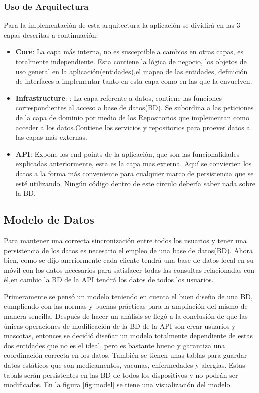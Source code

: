 \subsubsection{Uso de Arquitectura}
Para la implementación de esta arquitectura la aplicación se dividirá en las 3 capas descritas a continuación:

\begin{itemize}
	\item \textbf{Core}: La capa más interna, no es susceptible a cambios en otras capas, es totalmente independiente. Esta contiene la lógica de negocio, los objetos de uso general en la aplicación(entidades),el mapeo de las entidades, definición de interfaces a implementar tanto en esta capa como en las que la envuelven.
	
	\item \textbf{Infrastructure}: : La capa referente a datos, contiene las funciones correspondientes al acceso a base de datos(BD). Se subordina a las peticiones de la capa de dominio por medio de los
	Repositorios que implementan como acceder a los datos.Contiene los servicios y repositorios para proever datos a las capas más externas.
	
	\item \textbf{API}: Expone los end-points de la aplicación, que son las funcionalidades explicadas anteriormente, esta es la capa mas externa. Aquí se convierten los datos  a la forma más conveniente para cualquier marco de persistencia que se esté utilizando. Ningún código dentro de este círculo debería saber nada sobre la BD.
	
\end{itemize}
\newpage

\subsection{Modelo de Datos }

Para mantener una correcta sincronización entre todos los usuarios y tener una persistencia de  los datos es necesario el empleo de una base de datos(BD). Ahora bien, como se dijo aneriormente cada cliente tendrá una base de datos local en su móvil con los datos necesarios para satisfacer todas las consultas relacionadas con él,en cambio la BD de la API tendrá los datos de todos los usuarios. 

Primeramente se pensó un modelo teniendo en cuenta el buen diseño de una BD, cumpliendo con las normas y buenas prácticas para la ampliación del mismo de manera sencilla. Después de hacer un análisis se llegó a la conclusión de que las únicas operaciones de modificación de la BD de la API son crear  usuarios y mascotas, entonces se decidió diseñar un modelo totalmente dependiente de estas dos entidades que no es el ideal, pero es bastante bueno y garantiza una coordinación correcta en los datos. También se tienen unas tablas para guardar datos estáticos que son medicamentos, vacunas, enfermedades y alergias. Estas tabals serán persistentes en las BD de todos los dispositivos y no podrán ser modificados. En la figura \ref{fig:model} se tiene una visualización del modelo.


